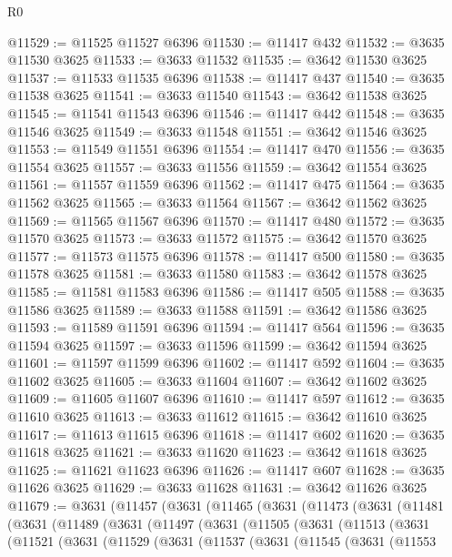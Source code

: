 \begin{lexlean}{R0}
\begin{coremodule}
@11529 := @11525 @11527 @6396
@11530 := @11417 @432
@11532 := @3635 @11530 @3625
@11533 := @3633 @11532
@11535 := @3642 @11530 @3625
@11537 := @11533 @11535 @6396
@11538 := @11417 @437
@11540 := @3635 @11538 @3625
@11541 := @3633 @11540
@11543 := @3642 @11538 @3625
@11545 := @11541 @11543 @6396
@11546 := @11417 @442
@11548 := @3635 @11546 @3625
@11549 := @3633 @11548
@11551 := @3642 @11546 @3625
@11553 := @11549 @11551 @6396
@11554 := @11417 @470
@11556 := @3635 @11554 @3625
@11557 := @3633 @11556
@11559 := @3642 @11554 @3625
@11561 := @11557 @11559 @6396
@11562 := @11417 @475
@11564 := @3635 @11562 @3625
@11565 := @3633 @11564
@11567 := @3642 @11562 @3625
@11569 := @11565 @11567 @6396
@11570 := @11417 @480
@11572 := @3635 @11570 @3625
@11573 := @3633 @11572
@11575 := @3642 @11570 @3625
@11577 := @11573 @11575 @6396
@11578 := @11417 @500
@11580 := @3635 @11578 @3625
@11581 := @3633 @11580
@11583 := @3642 @11578 @3625
@11585 := @11581 @11583 @6396
@11586 := @11417 @505
@11588 := @3635 @11586 @3625
@11589 := @3633 @11588
@11591 := @3642 @11586 @3625
@11593 := @11589 @11591 @6396
@11594 := @11417 @564
@11596 := @3635 @11594 @3625
@11597 := @3633 @11596
@11599 := @3642 @11594 @3625
@11601 := @11597 @11599 @6396
@11602 := @11417 @592
@11604 := @3635 @11602 @3625
@11605 := @3633 @11604
@11607 := @3642 @11602 @3625
@11609 := @11605 @11607 @6396
@11610 := @11417 @597
@11612 := @3635 @11610 @3625
@11613 := @3633 @11612
@11615 := @3642 @11610 @3625
@11617 := @11613 @11615 @6396
@11618 := @11417 @602
@11620 := @3635 @11618 @3625
@11621 := @3633 @11620
@11623 := @3642 @11618 @3625
@11625 := @11621 @11623 @6396
@11626 := @11417 @607
@11628 := @3635 @11626 @3625
@11629 := @3633 @11628
@11631 := @3642 @11626 @3625
@11679 := @3631
    (@11457
      (@3631
        (@11465
          (@3631
            (@11473
              (@3631
                (@11481
                  (@3631
                    (@11489
                      (@3631
                        (@11497
                          (@3631
                            (@11505
                              (@3631
                                (@11513
                                  (@3631
                                    (@11521
                                      (@3631
                                        (@11529
                                          (@3631
                                            (@11537
                                              (@3631
                                                (@11545
                                                  (@3631
                                                    (@11553

\end{coremodule}
\end{lexlean}
